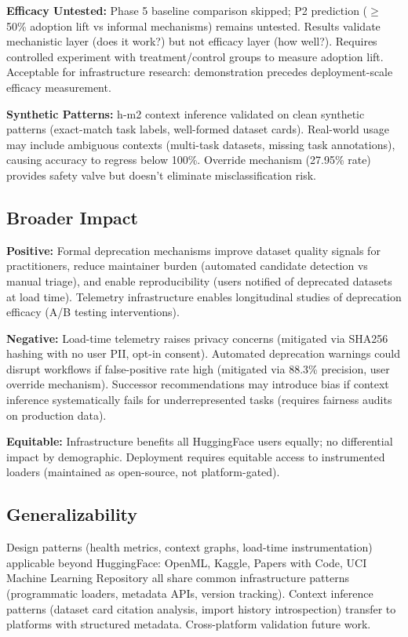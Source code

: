 \textbf{Efficacy Untested:} Phase 5 baseline comparison skipped; P2 prediction ($\geq$50\% adoption lift vs informal mechanisms) remains untested. Results validate mechanistic layer (does it work?) but not efficacy layer (how well?). Requires controlled experiment with treatment/control groups to measure adoption lift. Acceptable for infrastructure research: demonstration precedes deployment-scale efficacy measurement.

\textbf{Synthetic Patterns:} h-m2 context inference validated on clean synthetic patterns (exact-match task labels, well-formed dataset cards). Real-world usage may include ambiguous contexts (multi-task datasets, missing task annotations), causing accuracy to regress below 100\%. Override mechanism (27.95\% rate) provides safety valve but doesn't eliminate misclassification risk.

\subsection{Broader Impact}

\textbf{Positive:} Formal deprecation mechanisms improve dataset quality signals for practitioners, reduce maintainer burden (automated candidate detection vs manual triage), and enable reproducibility (users notified of deprecated datasets at load time). Telemetry infrastructure enables longitudinal studies of deprecation efficacy (A/B testing interventions).

\textbf{Negative:} Load-time telemetry raises privacy concerns (mitigated via SHA256 hashing with no user PII, opt-in consent). Automated deprecation warnings could disrupt workflows if false-positive rate high (mitigated via 88.3\% precision, user override mechanism). Successor recommendations may introduce bias if context inference systematically fails for underrepresented tasks (requires fairness audits on production data).

\textbf{Equitable:} Infrastructure benefits all HuggingFace users equally; no differential impact by demographic. Deployment requires equitable access to instrumented loaders (maintained as open-source, not platform-gated).

\subsection{Generalizability}

Design patterns (health metrics, context graphs, load-time instrumentation) applicable beyond HuggingFace: OpenML, Kaggle, Papers with Code, UCI Machine Learning Repository all share common infrastructure patterns (programmatic loaders, metadata APIs, version tracking). Context inference patterns (dataset card citation analysis, import history introspection) transfer to platforms with structured metadata. Cross-platform validation future work.

